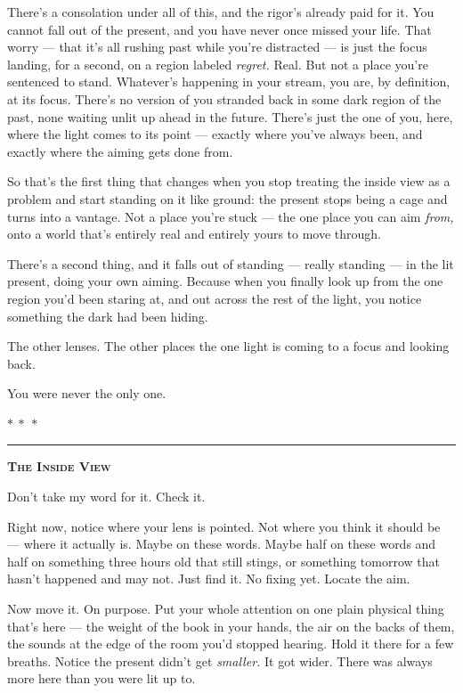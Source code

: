 \documentclass[11pt,openany]{book}
\begin{document}
There’s a consolation under all of this, and the rigor’s already paid for it. You cannot fall out of the present, and you have never once missed your life. That worry — that it’s all rushing past while you’re distracted — is just the focus landing, for a second, on a region labeled \textit{regret.} Real. But not a place you’re sentenced to stand. Whatever’s happening in your stream, you are, by definition, at its focus. There’s no version of you stranded back in some dark region of the past, none waiting unlit up ahead in the future. There’s just the one of you, here, where the light comes to its point — exactly where you’ve always been, and exactly where the aiming gets done from.

So that’s the first thing that changes when you stop treating the inside view as a problem and start standing on it like ground: the present stops being a cage and turns into a vantage. Not a place you’re stuck — the one place you can aim \textit{from,} onto a world that’s entirely real and entirely yours to move through.

There’s a second thing, and it falls out of standing — really standing — in the lit present, doing your own aiming. Because when you finally look up from the one region you’d been staring at, and out across the rest of the light, you notice something the dark had been hiding.

The other lenses. The other places the one light is coming to a focus and looking back.

You were never the only one.


\medskip\begin{center}\textcolor{rule}{$\ast\ \ast\ \ast$}\end{center}\medskip


\bigskip
{\par\noindent\color{rule}\rule{\linewidth}{0.8pt}}\par\smallskip
{\centering\scshape\bfseries The Inside View\par}\smallskip
\begingroup\setlength{\parindent}{0pt}\setlength{\parskip}{0.6em}
Don’t take my word for it. Check it.

Right now, notice where your lens is pointed. Not where you think it should be — where it actually is. Maybe on these words. Maybe half on these words and half on something three hours old that still stings, or something tomorrow that hasn’t happened and may not. Just find it. No fixing yet. Locate the aim.

Now move it. On purpose. Put your whole attention on one plain physical thing that’s here — the weight of the book in your hands, the air on the backs of them, the sounds at the edge of the room you’d stopped hearing. Hold it there for a few breaths. Notice the present didn’t get \textit{smaller.} It got wider. There was always more here than you were lit up to.
\end{document}
